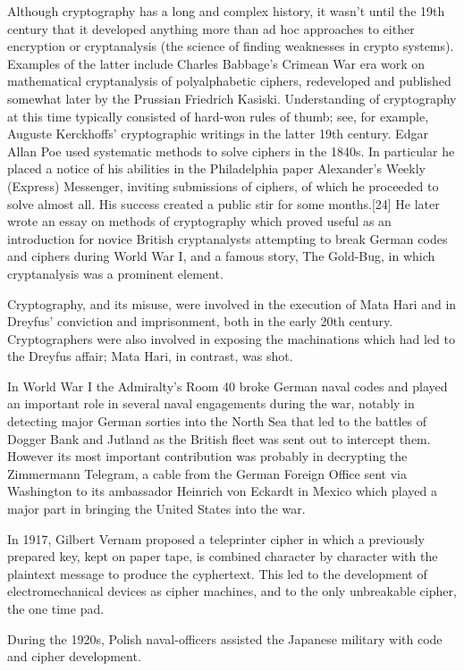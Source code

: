 \documentclass{report}
\theoremstyle{definition}
\begin{document}
{{\Large{Although cryptography has a long and complex history, it wasn't until the 19th century that it developed anything more than ad hoc approaches to either encryption or cryptanalysis (the science of finding weaknesses in crypto systems). Examples of the latter include Charles Babbage's Crimean War era work on mathematical cryptanalysis of polyalphabetic ciphers, redeveloped and published somewhat later by the Prussian Friedrich Kasiski. Understanding of cryptography at this time typically consisted of hard-won rules of thumb; see, for example, Auguste Kerckhoffs' cryptographic writings in the latter 19th century. Edgar Allan Poe used systematic methods to solve ciphers in the 1840s. In particular he placed a notice of his abilities in the Philadelphia paper Alexander's Weekly (Express) Messenger, inviting submissions of ciphers, of which he proceeded to solve almost all. His success created a public stir for some months.[24] He later wrote an essay on methods of cryptography which proved useful as an introduction for novice British cryptanalysts attempting to break German codes and ciphers during World War I, and a famous story, The Gold-Bug, in which cryptanalysis was a prominent element.

Cryptography, and its misuse, were involved in the execution of Mata Hari and in Dreyfus' conviction and imprisonment, both in the early 20th century. Cryptographers were also involved in exposing the machinations which had led to the Dreyfus affair; Mata Hari, in contrast, was shot.

In World War I the Admiralty's Room 40 broke German naval codes and played an important role in several naval engagements during the war, notably in detecting major German sorties into the North Sea that led to the battles of Dogger Bank and Jutland as the British fleet was sent out to intercept them. However its most important contribution was probably in decrypting the Zimmermann Telegram, a cable from the German Foreign Office sent via Washington to its ambassador Heinrich von Eckardt in Mexico which played a major part in bringing the United States into the war.

In 1917, Gilbert Vernam proposed a teleprinter cipher in which a previously prepared key, kept on paper tape, is combined character by character with the plaintext message to produce the cyphertext. This led to the development of electromechanical devices as cipher machines, and to the only unbreakable cipher, the one time pad.

During the 1920s, Polish naval-officers assisted the Japanese military with code and cipher development.
\begin{center}


\end{center}}}}
\end{document}
